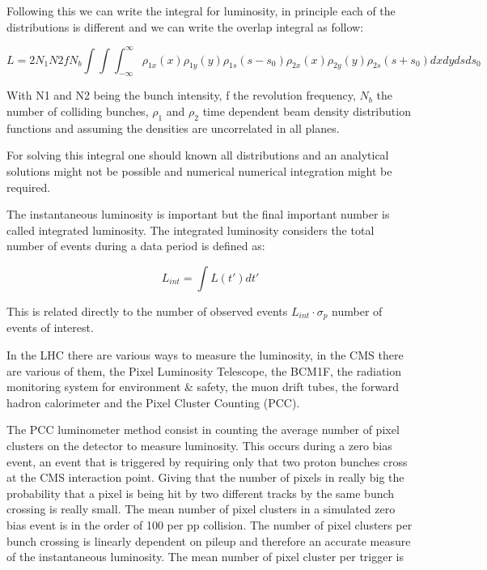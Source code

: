 Following this we can write the integral for luminosity, in principle each of the distributions is different and we can write the overlap integral as follow:

\begin{equation}
 L = 2N_{1}N{2}fN_{b} \int \int \int^{\infty}_{-\infty}  \rho_{1x} (x) \rho_{1y}(y) \rho_{1s} (s-s_{0}) \rho_{2x}(x) \rho_{2y}(y) \rho_{2s} (s+s_{0}) dxdydsds_{0}  
\end{equation}

With N1 and N2 being the bunch intensity, f the revolution frequency, $N_{b}$ the number of colliding bunches, $\rho_{1}$ and $\rho_{2}$ time dependent beam density distribution functions and assuming the densities are uncorrelated in all planes.  \cite{Lumvdm}

For solving this integral one should known all distributions and an analytical solutions might not be possible and numerical numerical integration might be required.


The instantaneous luminosity is important  but the final important number is called integrated luminosity. The integrated luminosity considers the total number of events during a data period is defined as: 

\begin{equation}
 L_{int} = \int L (t') dt' 
\end{equation}

This is related directly to the number of observed events $L_{int} \cdot \sigma_{p}$ number of events of interest.


In the LHC there are various ways to measure the luminosity, in the CMS there are various of them, the Pixel Luminosity Telescope, the BCM1F, the radiation monitoring system for environment & safety, the muon drift tubes, the forward hadron calorimeter and the Pixel Cluster Counting (PCC). 

The PCC luminometer method consist in counting the average number of pixel clusters on the detector to measure luminosity. This occurs during a zero bias event, an event that is triggered by requiring only that two proton bunches cross at the CMS interaction point. Giving that the number of pixels in really big the probability that a pixel is being hit by two different tracks by the same bunch crossing is really small. The mean number of pixel clusters in a simulated zero bias event is in the order of 100 per pp collision. The number of pixel clusters per bunch crossing is linearly dependent on pileup and therefore an accurate measure of the instantaneous luminosity.\cite{PCC1} The mean number of pixel cluster per trigger is 


